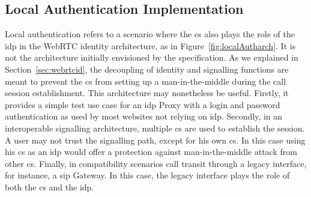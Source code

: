 \subsection{Local Authentication Implementation}
\label{sec:idpstd}
Local authentication refers to a scenario where the \gls{cs} also plays the role of the \gls{idp} in the WebRTC identity architecture, as in Figure~\ref{fig:localAutharch}.
It is not the architecture initially envisioned by the specification.
As we explained in Section~\ref{sec:webrtcid}, the decoupling of identity and signalling functions are meant to prevent the \gls{cs} from setting up a man-in-the-middle during the call session establishment.
This architecture may nonetheless be useful.
Firstly, it provides a simple test use case for an \gls{idp} Proxy with a login and password authentication as used by most websites not relying on \gls{idp}.
Secondly, in an interoperable signalling architecture, multiple \gls{cs} are used to establish the session.
A user may not trust the signalling path, except for his own \gls{cs}. 
In this case using his \gls{cs} as an \gls{idp} would offer a protection against man-in-the-middle attack from other \gls{cs}.
Finally, in compatibility scenarios call transit through a legacy interface, for instance, a \gls{sip} Gateway.
In this case, the legacy interface plays the role of both the \gls{cs} and the \gls{idp}.

